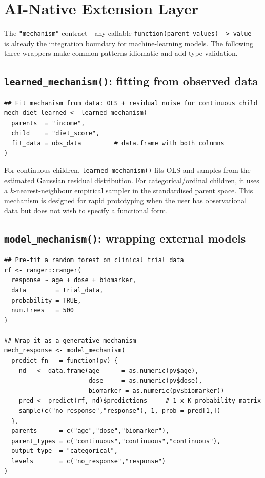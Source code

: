 \documentclass[12pt,a4paper]{article}
\newcommand{\code}[1]{\texttt{#1}}
\newcommand{\class}[1]{\mbox{\texttt{"#1"}}}
\newcommand{\fct}[1]{\mbox{\texttt{#1()}}}
\begin{document}
\section{AI-Native Extension Layer}
\label{sec:ai}

The \class{mechanism} contract---any callable
\code{function(parent\_values) -> value}---is already the integration boundary
for machine-learning models. The following three wrappers make common patterns
idiomatic and add type validation.

\subsection{\fct{learned\_mechanism}: fitting from observed data}
\label{sec:learned}

\begin{tcolorbox}[codebox, title={\small\textbf{R} code}]
\begin{verbatim}
## Fit mechanism from data: OLS + residual noise for continuous child
mech_diet_learned <- learned_mechanism(
  parents  = "income",
  child    = "diet_score",
  fit_data = obs_data         # data.frame with both columns
)
\end{verbatim}
\end{tcolorbox}

For continuous children, \fct{learned\_mechanism} fits OLS and samples from the
estimated Gaussian residual distribution. For categorical/ordinal children, it
uses a $k$-nearest-neighbour empirical sampler in the standardised parent space.
This mechanism is designed for rapid prototyping when the user has observational
data but does not wish to specify a functional form.

\subsection{\fct{model\_mechanism}: wrapping external models}
\label{sec:model_mech}

\begin{tcolorbox}[codebox, title={\small\textbf{R} code --- ranger random forest as mechanism}]
\begin{verbatim}
## Pre-fit a random forest on clinical trial data
rf <- ranger::ranger(
  response ~ age + dose + biomarker,
  data        = trial_data,
  probability = TRUE,
  num.trees   = 500
)

## Wrap it as a generative mechanism
mech_response <- model_mechanism(
  predict_fn   = function(pv) {
    nd   <- data.frame(age      = as.numeric(pv$age),
                       dose     = as.numeric(pv$dose),
                       biomarker = as.numeric(pv$biomarker))
    pred <- predict(rf, nd)$predictions     # 1 x K probability matrix
    sample(c("no_response","response"), 1, prob = pred[1,])
  },
  parents      = c("age","dose","biomarker"),
  parent_types = c("continuous","continuous","continuous"),
  output_type  = "categorical",
  levels       = c("no_response","response")
)
\end{verbatim}
\end{tcolorbox}
\end{document}

